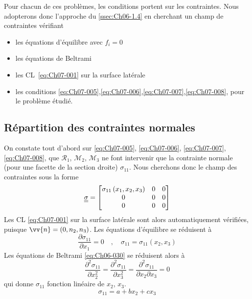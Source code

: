 Pour chacun de ces problèmes, les conditions portent sur les contraintes.
Nous adopterons donc l'approche du \ref{ssec:Ch06-1.4} en cherchant un champ de contraintes vérifiant
\begin{itemize}
    \item les équations d'équilibre avec $f_i=0$
    \item les équations de Beltrami
    \item les CL~\eqref{eq:Ch07-001} sur la surface latérale
    \item les conditions \eqref{eq:Ch07-005},\eqref{eq:Ch07-006},\eqref{eq:Ch07-007},\eqref{eq:Ch07-008}, pour le problème étudié.
\end{itemize}
\subsection{Répartition des contraintes normales} \label{ssec:Ch07-1.2}
On constate tout d'abord sur \eqref{eq:Ch07-005}, \eqref{eq:Ch07-006}, \eqref{eq:Ch07-007}, \eqref{eq:Ch07-008}, que $\mathcal{R}_1$, $\mathcal{M}_2$, $\mathcal{M}_3$ ne font intervenir que la contrainte normale (pour une facette de la section droite) $\sigma_{11}$.
Nous cherchons donc le champ des contraintes sous la forme
\begin{equation}
    \underline{\underline{\sigma}} = 
    \begin{bmatrix}
        \sigma_{11}\left( x_1, x_2, x_3 \right) & 0 & 0 \\
        0 & 0 & 0 \\
        0 & 0 & 0
    \end{bmatrix}
    \label{eq:Ch07-013}
\end{equation}
Les CL \eqref{eq:Ch07-001} sur la surface latérale sont alors automatiquement vérifiées, puisque $\vv{n}=\left( 0,n_2,n_3 \right)$.
Les équations d'équilibre se réduisent à
\begin{equation}
    \frac{\partial \sigma_{11}}{\partial x_1} = 0 \quad,\quad \sigma_{11} = \sigma_{11}\left( x_2,x_3 \right)
    \label{eq:Ch07-014}
\end{equation}
Les équations de Beltrami \eqref{eq:Ch06-030} se réduisent alors à
\begin{equation}
    \frac{\partial^2 \sigma_{11}}{\partial x_2^2} = \frac{\partial^2 \sigma_{11}}{\partial x_3^2} = \frac{\partial^2 \sigma_{11}}{\partial x_2 \partial x_3} = 0
    \label{eq:Ch07-015}
\end{equation}
qui donne $\sigma_{11}$ fonction linéaire de $x_2$, $x_3$.
\begin{equation}
    \sigma_{11} = a + b x_2 + c x_3
    \label{eq:Ch07-016}
\end{equation}
